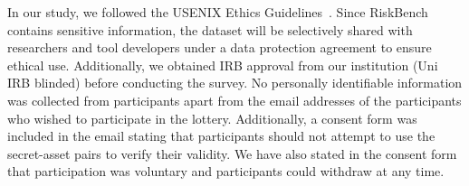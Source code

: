 In our study, we followed the USENIX Ethics Guidelines~\cite{ethics-guideline}. Since RiskBench contains sensitive information, the dataset will be selectively shared with researchers and tool developers under a data protection agreement to ensure ethical use. Additionally, we obtained IRB approval from our institution (Uni IRB blinded) before conducting the survey. No personally identifiable information was collected from participants apart from the email addresses of the participants who wished to participate in the lottery. Additionally, a consent form was included in the email stating that participants should not attempt to use the secret-asset pairs to verify their validity. We have also stated in the consent form that participation was voluntary and participants could withdraw at any time. 